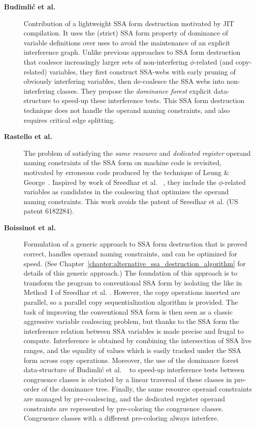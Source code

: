 \begin{description}
\item[\textbf{Budimli\'c et al.~\cite{Budimlic:2002:PLDI}}] Contribution of a lightweight SSA form
destruction motivated by JIT compilation. It uses the (strict) SSA form property
of dominance of variable definitions over uses to avoid the maintenance of an
explicit interference graph. Unlike previous approaches to SSA form destruction
that coalesce increasingly larger sets of non-interfering $\phi$-related (and
copy-related) variables, they first construct SSA-webs with early pruning of
obviously interfering variables, then de-coalesce the SSA webs into
non-interfering classes.  They propose the \emph{dominance forest} explicit
data-structure to speed-up these interference tests. This SSA form destruction
technique does not handle the operand naming constraints, and also requires
critical edge splitting.

\item[\textbf{Rastello et al.~\cite{Rastello:2004:CGO}}] The problem of
satisfying the \emph{same resource} and \emph{dedicated register} operand naming
constraints of the SSA form on machine code is revisited, motivated by erroneous code
produced by the technique of Leung \& George~\cite{Leung:1999:PLDI}. Inspired by
work of Sreedhar et al. ~\cite{Sreedhar:1999:SAS}, they include the
$\phi$-related variables as candidates in the coalescing that optimizes the
operand naming constraints.  This work avoids the patent of Sreedhar et al. (US
patent 6182284).


\item[\textbf{Boissinot et al.~\cite{Boissinot:2009:CGO}}] Formulation
of a generic approach to SSA form destruction that is proved correct, handles
operand naming constraints, and can be optimized for speed.
(See Chapter~\ref{chapter:alternative_ssa_destruction_algorithm} for details of
this generic approach.) The foundation of
this approach is to transform the program to conventional SSA form by isolating
the \phifuns like in Method~I of Sreedhar et al.
\cite{Sreedhar:1999:SAS}.  However, the copy operations inserted are parallel,
so a parallel copy sequentialization algorithm is provided. The task of
improving the conventional SSA form is then seen as a classic aggressive
variable coalescing problem, but thanks to the SSA form the
interference relation between SSA variables is made precise and frugal to
compute.  Interference is obtained by combining the intersection of SSA live
ranges, and the equality of values which is easily tracked under the SSA form
across copy operations. Moreover, the use of the dominance forest data-structure
of Budimli\'c et al. ~\cite{Budimlic:2002:PLDI} to speed-up interference tests
between congruence classes is obviated by a linear traversal of these classes in
pre-order of the dominance tree. Finally, the same resource operand constraints
are managed by pre-coalescing, and the dedicated register operand constraints
are represented by pre-coloring the congruence classes. Congruence classes with
a different pre-coloring always interfere.

\end{description}

